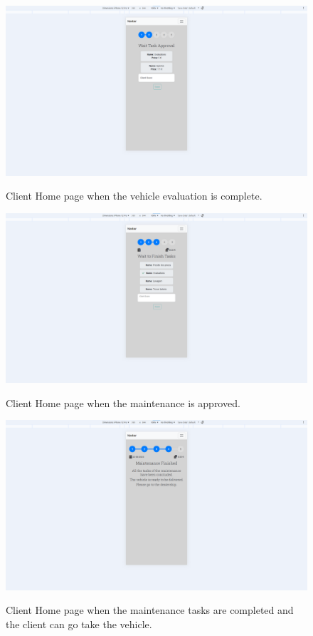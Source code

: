 \begin{figure}[h]
  \caption{Client Home page when the vehicle evaluation is complete.}
  \centering
  \includegraphics[width=\textwidth]{figs/Implementation/client/MaintenanceState2}
  \label{fig:figure2}
\end{figure}


\begin{figure}[h]
  \caption{Client Home page when the maintenance is approved.}
  \centering
  \includegraphics[width=\textwidth]{figs/Implementation/client/MaintenanceState3}
  \label{fig:figure2}
\end{figure}

\begin{figure}[h]
  \caption{Client Home page when the maintenance tasks are completed and the client can go take the vehicle.}
  \centering
  \includegraphics[width=\textwidth]{figs/Implementation/client/MaintenanceState4}
  \label{fig:figure2}
\end{figure}

